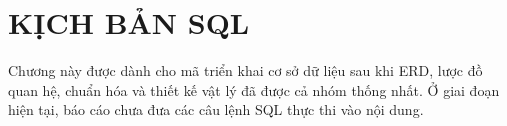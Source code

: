 \chapter{KỊCH BẢN SQL}

Chương này được dành cho mã triển khai cơ sở dữ liệu sau khi ERD, lược đồ quan hệ, chuẩn hóa và thiết kế vật lý đã được cả nhóm thống nhất. Ở giai đoạn hiện tại, báo cáo chưa đưa các câu lệnh SQL thực thi vào nội dung.
